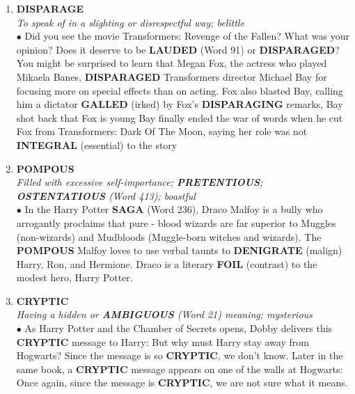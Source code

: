 \documentclass{book}
\begin{document}
\begin{enumerate}
\item \textbf{DISPARAGE}\\
\textit{ To speak of in a slighting or disrespectful way; belittle}\\

$\bullet$ Did you see the movie Transformers: Revenge of the Fallen? What was your opinion? Does it deserve to be \textbf{LAUDED} (Word 91) or \textbf{DISPARAGED}? You might be surprised to learn that Megan Fox, the actress who played Mikaela Banes, \textbf{DISPARAGED} Transformers director Michael Bay for focusing more on special effects than on acting. Fox also blasted Bay, calling him a dictator  \textbf{GALLED} (irked) by Fox's \textbf{DISPARAGING} remarks, Bay shot back that Fox is young  Bay finally ended the war of words when he cut Fox from Transformers: Dark Of The Moon, saying her role was not \textbf{INTEGRAL} (essential) to the story 

\item \textbf{POMPOUS} \\
\textit{Filled with excessive self-importance; \textbf{PRETENTIOUS}; \textbf{OSTENTATIOUS} (Word 413); boastful}\\

$\bullet$ In the Harry Potter \textbf{SAGA} (Word 236), Draco Malfoy is a bully who arrogantly proclaims that pure - blood wizards are far superior to Muggles (non-wizards) and Mudbloods (Muggle-born witches and wizards). The \textbf{POMPOUS} Malfoy loves to use verbal taunts to \textbf{DENIGRATE} (malign) Harry, Ron, and Hermione. Draco is a literary \textbf{FOIL} (contrast) to the modest hero, Harry Potter. 

\item \textbf{CRYPTIC}\\
\textit{ Having a hidden or \textbf{AMBIGUOUS} (Word 21) meaning; mysterious}\\

$\bullet$ As Harry Potter and the Chamber of Secrets opens, Dobby delivers this \textbf{CRYPTIC} message to Harry:  But why must Harry stay away from Hogwarts? Since the message is so \textbf{CRYPTIC}, we don't know. Later in the same book, a \textbf{CRYPTIC} message appears on one of the walls at Hogwarts:  Once again, since the message is \textbf{CRYPTIC}, we are not sure what it means. 


\end{enumerate}
\end{document}
